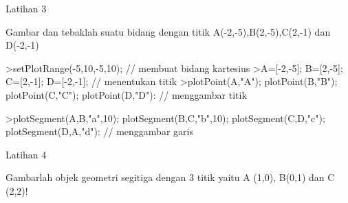 \documentclass[a4paper,10pt]{article}
\begin{document}
\begin{eulernotebook}
\begin{eulercomment}
\begin{eulercomment}
\begin{eulercomment}
\end{eulercomment}
\begin{eulercomment}
Latihan 3\\
\end{eulercomment}
\eulersubheading{}
\begin{eulercomment}
Gambar dan tebaklah suatu bidang dengan titik A(-2,-5),B(2,-5),C(2,-1)
dan D(-2,-1)
\end{eulercomment}
\begin{eulerprompt}
>setPlotRange(-5,10,-5,10); // membuat bidang kartesius
>A=[-2,-5]; B=[2,-5]; C=[2,-1]; D=[-2,-1]; // menentukan titik
>plotPoint(A,"A"); plotPoint(B,"B"); plotPoint(C,"C"); plotPoint(D,"D"): // menggambar titik
\end{eulerprompt}
\begin{eulerprompt}
>plotSegment(A,B,"a",10); plotSegment(B,C,"b",10); plotSegment(C,D,"c"); plotSegment(D,A,"d"): // menggambar garis
\end{eulerprompt}
\begin{eulercomment}
Latihan 4\\
\end{eulercomment}
\eulersubheading{}
\begin{eulercomment}
Gambarlah objek geometri segitiga dengan 3 titik yaitu A (1,0), B(0,1)
dan C (2,2)!


\end{eulercomment}
\end{eulercomment}
\end{eulercomment}
\end{eulernotebook}
\end{document}
